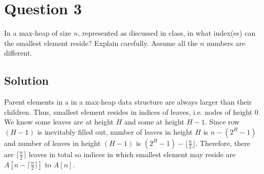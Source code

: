 
\section*{Question 3}

In a max-heap of size $n$, represented as discussed in class, in what index(es) can the smallest element reside? Explain carefully.
Assume all the $n$ numbers are different.

\subsection*{Solution}

Parent elements in a in a max-heap data structure are always larger than their children.
Thus, smallest element resides in indices of leaves, i.e. nodes of height $0$.
We know some leaves are at height $H$ and some at height $H-1$.
Since row $(H-1)$ is inevitably filled out, number of leaves in height $H$ is $n - (2^H - 1)$ and number of leaves in height $(H-1)$ is $(2^H-1)-\lfloor \frac{n}{2} \rfloor$.
Therefore, there are $\lceil \frac{n}{2} \rceil$ leaves in total so indices in which smallest element may reside are $A[n - \lceil \frac{n}{2} \rceil]$ to $A[n]$.
